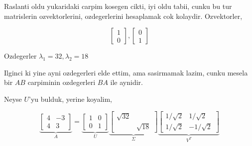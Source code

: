 \documentclass[12pt,fleqn]{article}\usepackage{../common}
\begin{document}
Raslanti oldu yukaridaki carpim kosegen cikti, iyi oldu tabii, cunku bu tur
matrislerin ozvektorlerini, ozdegerlerini hesaplamak cok
kolaydir. Ozvektorler, 

\[ 
\left[\begin{array}{r}
1 \\ 0
\end{array}\right],
\left[\begin{array}{r}
0 \\ 1
\end{array}\right]
 \]

Ozdegerler $\lambda_1 = 32, \lambda_2 = 18$

Ilginci ki yine ayni ozdegerleri elde ettim, ama sasirmamak lazim, cunku
mesela bir $AB$ carpiminin ozdegerleri $BA$ ile aynidir. 

Neyse $U$'yu bulduk, yerine koyalim, 

\[ 
\underbrace{
\left[\begin{array}{rr}
4 & -3 \\ 4 & 3
\end{array}\right] 
}_{A}
=
\underbrace{
\left[\begin{array}{rr}
1 & 0 \\ 0 & 1 
\end{array}\right]
}_{U}
\underbrace{
\left[\begin{array}{rr}
\sqrt{ 32} &  \\  & \sqrt{ 18}
\end{array}\right]
}_{\Sigma}
\underbrace{
\left[\begin{array}{rr}
1/\sqrt{ 2} & 1/\sqrt{ 2} \\ 1/\sqrt{ 2} & -1/\sqrt{ 2}
\end{array}\right]
}_{V^T}
 \]
\end{document}
